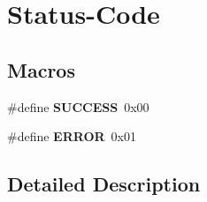 \hypertarget{group___status-_code}{\section{Status-\/\-Code}
\label{group___status-_code}
}
\subsection*{Macros}
\begin{DoxyCompactItemize}
\item 
\hypertarget{group___status-_code_gaa90cac659d18e8ef6294c7ae337f6b58}{\#define {\bfseries S\-U\-C\-C\-E\-S\-S}~0x00}\label{group___status-_code_gaa90cac659d18e8ef6294c7ae337f6b58}

\item 
\hypertarget{group___status-_code_ga8fe83ac76edc595f6b98cd4a4127aed5}{\#define {\bfseries E\-R\-R\-O\-R}~0x01}\label{group___status-_code_ga8fe83ac76edc595f6b98cd4a4127aed5}

\end{DoxyCompactItemize}


\subsection{Detailed Description}
